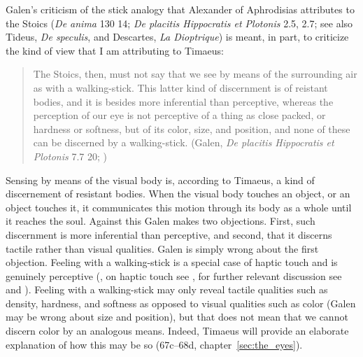 Galen's criticism of the stick analogy that Alexander of Aphrodisias attributes to the Stoics (\emph{De anima} 130 14; \emph{De placitis Hippocratis et Plotonis} 2.5, 2.7; see also Tideus, \emph{De speculis}, and Descartes, \emph{La Dioptrique}) is meant, in part, to criticize the kind of view that I am attributing to Timaeus:
\begin{quote}
	The Stoics, then, must not say that we see by means of the surrounding air as with a walking-stick. This latter kind of discernment is of reistant bodies, and it is besides more inferential than perceptive, whereas the perception of our eye is not perceptive of a thing as close packed, or hardness or softness, but of its color, size, and position, and none of these can be discerned by a walking-stick. (Galen, \emph{De placitis Hippocratis et Plotonis} 7.7 20; \citealt[475]{Lacy:1980mk})
\end{quote}
Sensing by means of the visual body is, according to Timaeus, a kind of discernement of resistant bodies. When the visual body touches an object, or an object touches it, it communicates this motion through its body as a whole until it reaches the soul. Against this Galen makes two objections. First, such discernment is more inferential than perceptive, and second, that it discerns tactile rather than visual qualities. Galen is simply wrong about the first objection. Feeling with a walking-stick is a special case of haptic touch and is genuinely perceptive (\citealt[47]{Dennett:1993ce}, on haptic touch see \citealt{Lederman:1987fr}, for further relevant discussion see \citealt{Fulkerson:2014ek} and \citealt[chapters 1--2]{Kalderon:2018oe}). Feeling with a walking-stick may only reveal tactile qualities such as density, hardness, and softness as opposed to visual qualities such as color (Galen may be wrong about size and position), but that does not mean that we cannot discern color by an analogous means. Indeed, Timaeus will provide an elaborate explanation of how this may be so (67c–68d, chapter~\ref{sec:the_eyes}).

